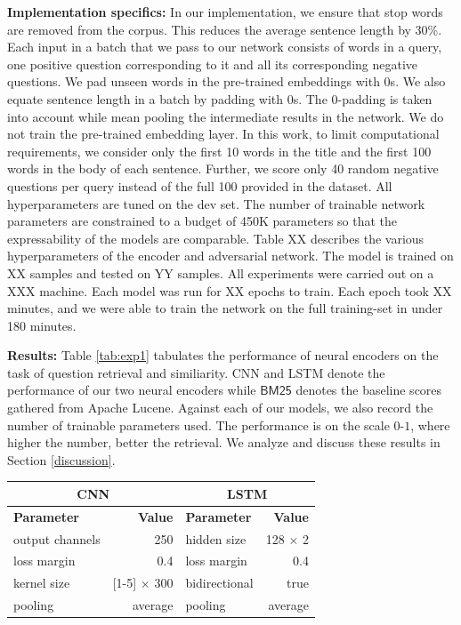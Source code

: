 \documentclass{sigkddExp}
\begin{document}
\textbf{Implementation specifics:}
In our implementation, we ensure that stop words are removed from the corpus. This reduces the average sentence length by 30\%. Each input in a batch that we pass to our network consists of words in a query, one positive question corresponding to it and all its corresponding negative questions. We pad unseen words in the pre-trained embeddings with 0s. We also equate sentence length in a batch by padding with 0s. The 0-padding is taken into account while mean pooling the intermediate results in the network. We do not train the pre-trained embedding layer. In this work, to limit computational requirements, we consider only the first 10 words in the title and the first 100 words in the body of each sentence. Further, we score only 40 random negative questions per query instead of the full 100 provided in the dataset. All hyperparameters are tuned on the dev set. The number of trainable network parameters are constrained to a budget of 450K parameters so that the expressability of the models are comparable. Table {\color{red} XX} describes the various hyperparameters of the encoder and adversarial network. The model is trained on {\color{red} XX samples and tested on YY samples. All experiments were carried out on a XXX machine. Each model was run for {\color{red} XX epochs} to train. Each epoch took XX minutes, and we were able to train the network on the full training-set in under 180 minutes.}

\textbf{Results:}
Table \ref{tab:exp1} tabulates the performance of neural encoders on the task of question retrieval and similiarity. CNN and LSTM denote the performance of our two neural encoders while $\textsf{BM25}$ denotes the baseline scores gathered from Apache Lucene. Against each of our models, we also record the number of trainable parameters used. The performance is on the scale $0$-$1$, where higher the number, better the retrieval. We analyze and discuss these results in Section \ref{discussion}.


\begin{table}[h]
\begin{tabular}{l|r|l|r}
      \multicolumn{2}{c|}{\textbf{CNN}}
     & \multicolumn{2}{c}{\textbf{LSTM}}
     \\
     \toprule
     \textbf{Parameter}
     & \textbf{Value}
     & \textbf{Parameter}
     & \textbf{Value}
     \\
     \midrule
     output channels
     & 250
     & hidden size
     & 128 $\times$ 2
     \\
     loss margin
     & 0.4
     & loss margin
     & 0.4
     \\
     kernel size
     & [1-5] $\times$ 300
     & bidirectional
     & true
     \\
     pooling
     & average
     & pooling
     & average
\end{tabular}
\end{table}
\end{document}
